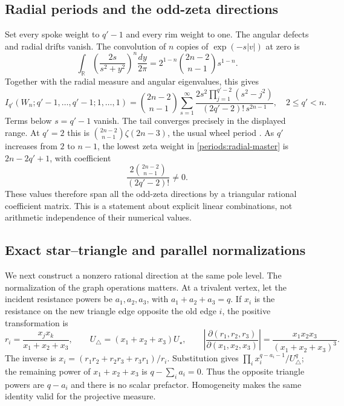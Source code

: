 \subsection{Radial periods and the odd-zeta directions}
\label{periods:radial}

Set every spoke weight to $q'-1$ and every rim weight to one.  The
angular defects and radial drifts vanish.  The convolution of $n$
copies of $\exp(-s|v|)$ at zero is
\begin{equation}
 \int_{\mathbb R}\left(\frac{2s}{s^2+y^2}\right)^n\frac{dy}{2\pi}
 =2^{1-n}\binom{2n-2}{n-1}s^{1-n}.
 \label{periods:radial-convolution}
\end{equation}
Together with the radial measure and angular eigenvalues, this gives
\begin{equation}
 I_{q'}(W_n;q'-1,\ldots,q'-1;1,\ldots,1)
 =\binom{2n-2}{n-1}
 \sum_{s=1}^{\infty}
 \frac{2s^2\prod_{j=1}^{q'-2}(s^2-j^2)}
 {(2q'-2)!\,s^{2n-1}},
 \quad 2\le q'<n.
 \label{periods:radial-master}
\end{equation}
Terms below $s=q'-1$ vanish.  The tail converges precisely in the
displayed range.  At $q'=2$ this is
$\binom{2n-2}{n-1}\zeta(2n-3)$, the usual wheel period
\cite{bloch2006}.  As $q'$ increases from $2$ to $n-1$, the lowest zeta
weight in \eqref{periods:radial-master} is
$2n-2q'+1$, with coefficient
\begin{equation}
 \frac{2\binom{2n-2}{n-1}}{(2q'-2)!}\ne0.
 \label{periods:radial-diagonal}
\end{equation}
These values therefore span all the odd-zeta directions by a triangular
rational coefficient matrix.  This is a statement about explicit linear
combinations, not arithmetic independence of their numerical values.

\subsection{Exact star--triangle and parallel normalizations}
\label{periods:star-parallel}

We next construct a nonzero rational direction at the same pole level.
The normalization of the graph operations matters.  At a trivalent
vertex, let the incident resistance powers be $a_1,a_2,a_3$, with
$a_1+a_2+a_3=q$.  If $x_i$ is the resistance on the new triangle edge
opposite the old edge $i$, the positive transformation is
\begin{equation}
 r_i=\frac{x_jx_k}{x_1+x_2+x_3},\qquad
 U_{\triangle}=(x_1+x_2+x_3)U_{\star},\qquad
 \left|\frac{\partial(r_1,r_2,r_3)}{\partial(x_1,x_2,x_3)}\right|
 =\frac{x_1x_2x_3}{(x_1+x_2+x_3)^3}.
 \label{periods:star-map}
\end{equation}
The inverse is $x_i=(r_1r_2+r_2r_3+r_3r_1)/r_i$.  Substitution gives
$\prod_i x_i^{q-a_i-1}/U_\triangle^q$; the remaining power of
$x_1+x_2+x_3$ is $q-\sum_i a_i=0$.  Thus the opposite triangle powers
are $q-a_i$ and there is no scalar prefactor.  Homogeneity makes the
same identity valid for the projective measure.

